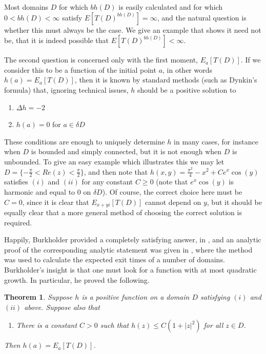 \documentclass[a4paper, oneside, 12pt]{amsart}
\newtheorem{theorem}{Theorem}[section]
\begin{document}
Most domains $D$ for which $bh(D)$ is easily calculated and for which $0<bh(D)<\infty$ satisfy $E[T(D)^{bh(D)}]=\infty$, and the natural question is whether this must always be the case. We give an example that shows it need not be, that it is indeed possible that $E[T(D)^{bh(D)}]<\infty$.

The second question is concerned only with the first moment, $E_a[T(D)]$. If we consider this to be a function of the initial point $a$, in other words $h(a) = E_a[T(D)]$, then it is known by standard methods (such as Dynkin's formula) that, ignoring technical issues, $h$ should be a positive solution to

\begin{enumerate}
    \item[$(i)$] $\Delta h = -2$

    \item[$(ii)$] $h(a) = 0$ for $a \in \delta D$
\end{enumerate}

These conditions are enough to uniquely determine $h$ in many cases, for instance when $D$ is bounded and simply connected, but it is not enough when $D$ is unbounded. To give an easy example which illustrates this we may let $D = \{-\frac{\pi}{2} < Re(z) < \frac{\pi}{2}\}$, and then note that
$h(x,y) = \frac{\pi^2}{4} - x^2 + Ce^x \cos(y)$ satisfies $(i)$ and $(ii)$ for any constant $C \geq 0$ (note that $e^x \cos(y)$ is harmonic and equal to $0$ on $\delta D$). Of course, the correct choice here must be $C=0$, since it is clear that $E_{x+yi}[T(D)]$ cannot depend on $y$, but it should be equally clear that a more general method of choosing the correct solution is required.

Happily, Burkholder provided a completely satisfying answer, in \cite{burk}, and an analytic proof of the corresponding analytic statement was given in \cite{markowsky2013method}, where the method was used to calculate the expected exit times of a number of domains. Burkholder's insight is that one must look for a function with at most quadratic growth. In particular, he proved the following.

\begin{theorem} \label{burk_thm}
    Suppose $h$ is a positive function on a domain $D$ satisfying $(i)$ and $(ii)$ above. Suppose also that

    \begin{enumerate}
    \item[$(iii)$] There is a constant $C>0$ such that $h(z) \leq C(1+|z|^2)$ for all $z \in D$.
\end{enumerate}

Then $h(a) = E_a[T(D)]$.
\end{theorem}
\end{document}
